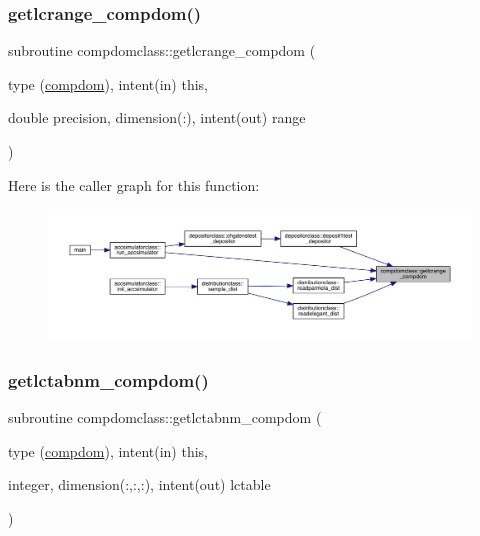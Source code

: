 \subsubsection{\texorpdfstring{getlcrange\_compdom()}{getlcrange\_compdom()}}
{\footnotesize\ttfamily subroutine compdomclass\+::getlcrange\+\_\+compdom (\begin{DoxyParamCaption}\item[{type (\mbox{\hyperlink{namespacecompdomclass_structcompdomclass_1_1compdom}{compdom}}), intent(in)}]{this,  }\item[{double precision, dimension(\+:), intent(out)}]{range }\end{DoxyParamCaption})}

Here is the caller graph for this function\+:\nopagebreak
\begin{figure}[H]
\begin{center}
\leavevmode
\includegraphics[width=350pt]{namespacecompdomclass_ad0a907860c5bf17c263d8ad957c7ed1d_icgraph}
\end{center}
\end{figure}
\mbox{\label{namespacecompdomclass_a7c7c1450a459bb1753ef8230ab0d7651}} 
\subsubsection{\texorpdfstring{getlctabnm\_compdom()}{getlctabnm\_compdom()}}
{\footnotesize\ttfamily subroutine compdomclass\+::getlctabnm\+\_\+compdom (\begin{DoxyParamCaption}\item[{type (\mbox{\hyperlink{namespacecompdomclass_structcompdomclass_1_1compdom}{compdom}}), intent(in)}]{this,  }\item[{integer, dimension(\+:,\+:,\+:), intent(out)}]{lctable }\end{DoxyParamCaption})}

